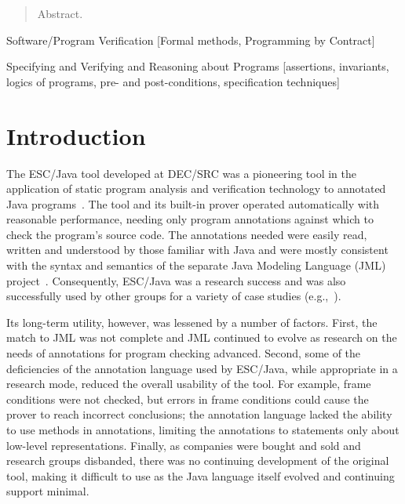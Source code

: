 \documentclass{acm_proc_article-sp}
\newif\ifpdf
\begin{document}
\newcommand{\myhref}[2]{\ifpdf\href{#1}{#2}\else\htmladdnormallinkfoot{#2}{#1}\fi}

\maketitle
\begin{abstract}
Abstract.
\end{abstract}

                {Software/Program Verification}
                [Formal methods, Programming by Contract]

                {Specifying and Verifying and Reasoning about Programs}
                [assertions, invariants, logics of programs,
                pre- and post-conditions, specification techniques]




\section{Introduction}

The ESC/Java tool developed at DEC/SRC was a pioneering tool in the
application of static program analysis and verification technology to
annotated Java programs~\cite{ESCJava}.  The tool and its built-in
prover operated automatically with reasonable performance, needing
only program annotations against which to check the program's source
code.  The annotations needed were easily read, written and understood
by those familiar with Java and were mostly consistent with the syntax
and semantics of the separate Java Modeling Language (JML)
project~\cite{Leavens-etal00,jmlpapers}.  Consequently, ESC/Java was a
research success and was also successfully used by other groups for a
variety of case studies (e.g.,~\cite{Hub03,HOP04}).

Its long-term utility, however, was lessened by a number of factors.
First, the match to JML was not complete and JML continued to evolve
as research on the needs of annotations for program checking advanced.
Second, some of the deficiencies of the annotation language used by
ESC/Java, while appropriate in a research mode, reduced the overall
usability of the tool.  For example, frame conditions were not
checked, but errors in frame conditions could cause the prover to
reach incorrect conclusions; the annotation language lacked the
ability to use methods in annotations, limiting the annotations to
statements only about low-level representations.  Finally, as
companies were bought and sold and research groups disbanded, there
was no continuing development of the original tool, making it
difficult to use as the Java language itself evolved and continuing
support minimal.
\end{document}
